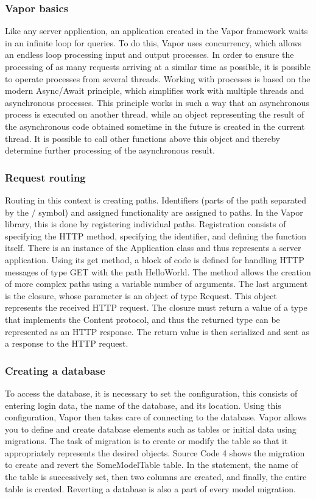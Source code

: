 \documentclass[
  biblatex,
  language=english,
  figures=false,
  sourcecodes,
  glossaries,
  index
]{kidiplom}
\begin{document}
\subsubsection{Vapor basics}
Like any server application, an application created in the Vapor framework\cite{bib5} waits in an infinite loop for queries. To do this, Vapor uses concurrency, which allows an endless loop processing input and output processes. In order to ensure the processing of as many requests arriving at a similar time as possible, it is possible to operate processes from several threads. Working with processes is based on the modern Async/Await principle, which simplifies work with multiple threads and asynchronous processes.
This principle works in such a way that an asynchronous process is executed on another thread, while an object representing the result of the asynchronous code obtained sometime in the future is created in the current thread. It is possible to call other functions above this object and thereby determine further processing of the asynchronous result.

\subsubsection{Request routing}
Routing in this context is creating paths. Identifiers (parts of the path separated by the / symbol) and assigned functionality are assigned to paths. In the Vapor library, this is done by registering individual paths. Registration consists of specifying the HTTP method, specifying the identifier, and defining the function itself.
There is an instance of the Application class and thus represents a server application. Using its get method, a block of code is defined for handling HTTP messages of type GET with the path HelloWorld. The method allows the creation of more complex paths using a variable number of arguments. The last argument is the closure, whose parameter is an object of type Request. This object represents the received HTTP request. The closure must return a value of a type that implements the Content protocol, and thus the returned type can be represented as an HTTP response. The return value is then serialized and sent as a response to the HTTP request.

\subsubsection{Creating a database}
To access the database, it is necessary to set the configuration, this consists of entering login data, the name of the database, and its location. Using this configuration, Vapor then takes care of connecting to the database. Vapor allows you to define and create database elements such as tables or initial data using migrations. The task of migration is to create or modify the table so that it appropriately represents the desired objects. Source Code 4 shows the migration to create and revert the SomeModelTable table. In the statement, the name of the table is successively set, then two columns are created, and finally, the entire table is created. Reverting a database is also a part of every model migration.
\end{document}
